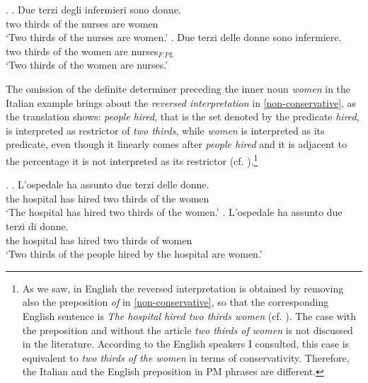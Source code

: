 \documentclass[charis, linguex]{glossa}
\begin{document}
\ex. \label{filodonne} 
     \ag. Due terzi degli infermieri sono donne. \\    
          two thirds {of the} nurses are women \\  
	 \glt `Two thirds of the nurses are women.'  \label{filosofi}
     \bg.  Due terzi delle donne sono infermiere. \\   
	 	   two thirds {of the} women are nurses$_{F.PL}$ \\ 
      \glt `Two thirds of the  women are nurses.'  \label{donneinf}


The omission of the definite determiner preceding the inner noun \textit{women} in the Italian example brings about the \textit{reversed interpretation} in \ref{non-conservative}, as the translation shows: \textit{people hired}, that is the set denoted by the predicate \textit{hired}, is interpreted as restrictor of \textit{two thirds}, while \textit{women} is interpreted as its predicate, even though it linearly comes after \textit{people hired} and it is adjacent to the percentage it is not interpreted as its restrictor (cf. \citealt[ex.20]{ahn15a}).\footnote{As we saw, in English the reversed interpretation is obtained by removing also the preposition \textit{of} in \ref{non-conservative}, so that the corresponding English sentence is \textit{The hospital hired two thirds women} (cf. \citealt[ex.20]{ahn15a}). The case with the preposition and without the article \textit{two thirds of women} is not discussed in the literature. According to the English speakers I consulted, this case is equivalent to \textit{two thirds of the women} in terms of conservativity. Therefore, the Italian and the English preposition  in PM phrases are different.}

 \ex. \label{femmiine}  \ag. L'ospedale ha assunto due terzi delle donne.  \\
       {the hospital} has hired two thirds {of the} women \\     
	\glt  `The hospital has hired two thirds of the women.' \label{conservative}	
     \bg. L'ospedale ha assunto due terzi di donne.  \\
       {the hospital} has hired two thirds of women \\     
	\glt  `Two thirds of the people hired by the hospital are women.' \label{non-conservative}	
		  
\end{document}

